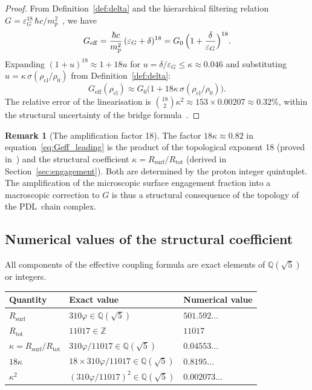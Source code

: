 \documentclass[11pt,a4paper]{article}
\theoremstyle{definition}
\newtheorem{remark}[theorem]{Remark}
\newcommand{\PDL}{\textnormal{PDL}}
\newcommand{\Rsurf}{R_{\mathrm{surf}}}
\newcommand{\Rtot}{R_{\mathrm{tot}}}
\newcommand{\epsg}{\varepsilon_G}
\newcommand{\Geff}{G_{\mathrm{eff}}}
\newcommand{\Gzero}{G_0}
\newcommand{\vp}{\varphi}
\newcommand{\kap}{\kappa}
\newcommand{\sig}{\sigma}
\newcommand{\rhocl}{\rho_{\mathrm{cl}}}
\newcommand{\rhoO}{\rho_0}
\begin{document}
\begin{proof}
From Definition~\ref{def:delta} and the hierarchical filtering relation $G = \epsg^{18}\,\hbar c/m_p^2$~\cite{PDL_Bridge_2026,Topology_18_PDL_2026}, we have
\[
  \Geff = \frac{\hbar c}{m_p^2}\,(\epsg + \delta)^{18} = \Gzero\,\Bigl(1 + \frac{\delta}{\epsg}\Bigr)^{18}.
\]
Expanding $(1+u)^{18} \approx 1 + 18u$ for $u = \delta/\epsg \leq \kap \approx 0.046$ and substituting $u = \kap\,\sig(\rhocl/\rhoO)$ from Definition~\ref{def:delta}:
\[
  \Geff(\rhocl) \approx \Gzero\bigl(1 + 18\kap\,\sig(\rhocl/\rhoO)\bigr).
\]
The relative error of the linearisation is $\binom{18}{2}\kap^2 \approx 153 \times 0.00207 \approx 0.32\%$, within the structural uncertainty of the bridge formula~\cite{PDL_Bridge_2026}.
\end{proof}

\begin{remark}[The amplification factor 18]
\label{rem:amplification}
The factor $18\kap \approx 0.82$ in equation~\eqref{eq:Geff_leading} is the product of the topological exponent 18 (proved in~\cite{Topology_18_PDL_2026}) and the structural coefficient $\kap = \Rsurf/\Rtot$ (derived in Section~\ref{sec:engagement}). Both are determined by the proton integer quintuplet. The amplification of the microscopic surface engagement fraction into a macroscopic correction to $G$ is thus a structural consequence of the topology of the \PDL\ chain complex.
\end{remark}

\subsection{Numerical values of the structural coefficient}
\label{subsec:kap_numerical}

All components of the effective coupling formula are exact elements of $\mathbb{Q}(\sqrt{5})$ or integers.

\begin{center}
\begin{tabular}{lll}
\toprule
Quantity & Exact value & Numerical value \\
\midrule
$\Rsurf$ & $310\vp \in \mathbb{Q}(\sqrt{5})$ & $501.592\ldots$ \\
$\Rtot$ & $11017 \in \mathbb{Z}$ & $11017$ \\
$\kap = \Rsurf/\Rtot$ & $310\vp/11017 \in \mathbb{Q}(\sqrt{5})$ & $0.04553\ldots$ \\
$18\kap$ & $18 \times 310\vp/11017 \in \mathbb{Q}(\sqrt{5})$ & $0.8195\ldots$ \\
$\kap^2$ & $(310\vp/11017)^2 \in \mathbb{Q}(\sqrt{5})$ & $0.002073\ldots$ \\
\bottomrule
\end{tabular}
\end{center}
\end{document}
